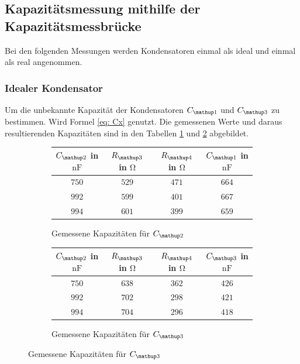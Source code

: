 \subsection{Kapazitätsmessung mithilfe der Kapazitätsmessbrücke}

Bei den folgenden Messungen werden
Kondensatoren einmal als ideal und einmal als real angenommen.

\subsubsection{Idealer Kondensator}

Um die unbekannte Kapazität der Kondensatoren $C\ua{1}$ und $C\ua{3}$
zu bestimmen. Wird Formel \eqref{eq: Cx} genutzt.
Die gemessenen Werte und daraus resultierenden Kapazitäten sind in den %
Tabellen \ref{tab:kap_c1} und \ref{tab:kap_c3} abgebildet.

\begin{figure}
\begin{subfigure}{0.49\textwidth}
\centering
\hspace{-0.25cm}
\caption{Gemessene Kapazitäten für $C\ua{2}$}
  \label{tab:kap_c1}
\begin{tabular}{S S S S}
    \toprule
    {$C\ua{2}$ in $\si{\nano\farad}$} &  {$R\ua{3}$ in $\si{\ohm}$} & {$R\ua{4}$ in $\si{\ohm}$} & {$C\ua{1}$ in $\si{\nano\farad}$}  \\
    \midrule
     {$\num{750}$} & {$\num{529}$} &  {$\num{471}$}& {$\num{664}$}  \\
     {$\num{992}$} & {$\num{599}$}  & {$\num{401}$} & {$\num{667}$}  \\
     {$\num{994}$} & {$\num{601}$}  & {$\num{399}$} & {$\num{659}$}  \\
     \bottomrule
	\end{tabular}

\end{subfigure}
\hspace{0.5cm}
\begin{subfigure}{0.49\textwidth}
\centering
\caption{Gemessene Kapazitäten für $C\ua{3}$}
  \label{tab:kap_c3}
\begin{tabular}{S S S S}
      \toprule
    {$C\ua{2}$ in $\si{\nano\farad}$} &  {$R\ua{3}$ in $\si{\ohm}$} & {$R\ua{4}$ in $\si{\ohm}$} & {$C\ua{3}$ in $\si{\nano\farad}$}  \\
    \midrule
     {$\num{750}$} & {$\num{638}$}  & {$\num{362}$} & {$\num{426}$}  \\
     {$\num{992}$} & {$\num{702}$}  & {$\num{298}$} & {$\num{421}$}  \\
     {$\num{994}$} & {$\num{704}$} &  {$\num{296}$}& {$\num{418}$}  \\
     \bottomrule
  \end{tabular}
\end{subfigure}
\label{fig:tabellen_cx_3}
\end{figure}

